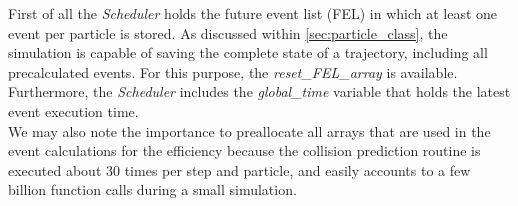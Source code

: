 First of all the \textit{Scheduler} holds the future event list (FEL) in which at least one event per particle is stored. As discussed within \autoref{sec:particle_class}, the simulation is capable of saving the complete state of a trajectory, including all precalculated events. For this purpose, the \textit{reset\_FEL\_array} is available. Furthermore, the \textit{Scheduler} includes the \textit{global\_time} variable that holds the latest event execution time.\\

We may also note the importance to preallocate all arrays that are used in the event calculations for the efficiency because the collision prediction routine is executed about 30 times per step and particle, and easily accounts to a few billion function calls during a small simulation.

